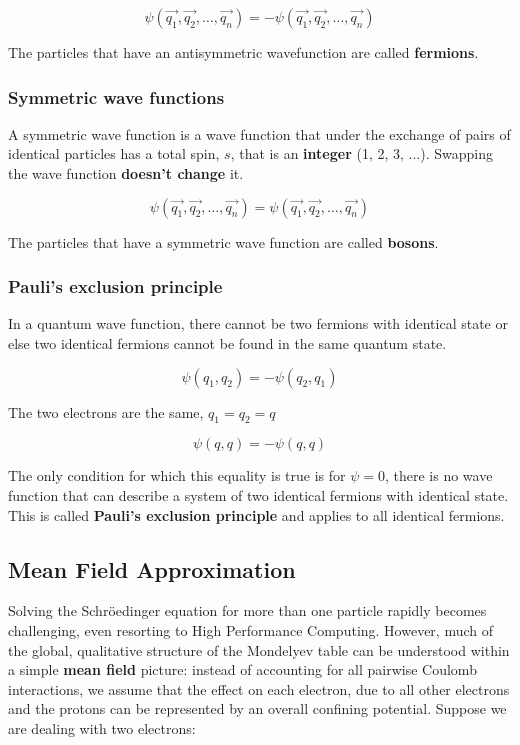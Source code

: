 		$$\psi(\vec{q_1},\vec{q_2}, \dots, \vec{q_n})=-\psi(\vec{q_1},\vec{q_2}, \dots, \vec{q_n})$$

		The particles that have an antisymmetric wavefunction are called \textbf{fermions}.

		\subsubsection{Symmetric wave functions}
		A symmetric wave function is a wave function that under the exchange of pairs of identical particles has a total spin, $s$, that is an \textbf{integer} (1, 2, 3, ...).
		Swapping the wave function \textbf{doesn't change} it.

		$$\psi(\vec{q_1},\vec{q_2}, \dots, \vec{q_n})=\psi(\vec{q_1},\vec{q_2}, \dots, \vec{q_n})$$

		The particles that have a symmetric wave function are called \textbf{bosons}.

		\subsubsection{Pauli's exclusion principle}
		In a quantum wave function, there cannot be two fermions with identical state or else two identical fermions cannot be found in the same quantum state.

		$$\psi(q_1, q_2)= -\psi(q_2,q_1)$$

		The two electrons are the same, $q_1=q_2=q$

		$$\psi(q,q)=-\psi(q,q)$$

		The only condition for which this equality is true is for  $\psi = 0$, there is no wave function that can describe a system of two identical fermions with identical state.
		This is called \textbf{Pauli's exclusion principle} and applies to all identical fermions.
	\subsection{Mean Field Approximation}
	Solving the Schr\"oedinger equation for more than one particle rapidly becomes challenging, even resorting to High Performance Computing.
	However, much of the global, qualitative structure of the Mondelyev table can be understood within a simple \textbf{mean field} picture: instead of accounting for all pairwise Coulomb interactions, we assume that the effect on each electron, due to all other electrons and the protons can be represented by an overall confining potential.
	Suppose we are dealing with two electrons:


